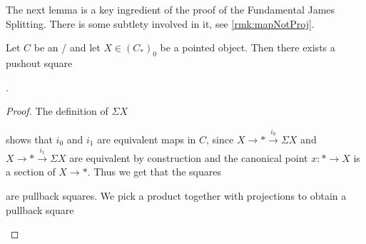 The next lemma is a key ingredient of the proof of the Fundamental James Splitting.
There is some subtlety involved in it, see \cref{rmk:mapNotProj}.
\begin{lemma}\label{lem:existenceOfPoSq}
    Let $C$ be an \inftytop/ and let $X\in \left(C_*\right)_0$ be a pointed object.
    Then there exists a pushout square  
    \begin{center}
        \;.
    \end{center}
    \begin{proof}
        The definition of $\Sigma X$
        \begin{center}
        \end{center}
        shows that $i_0$ and $i_1$ are equivalent maps in $C$, since $X\to *\xrightarrow{i_0}\Sigma X$ and $X\to *\xrightarrow{i_1}\Sigma X$ are equivalent by construction and the canonical point $x\colon*\to X$ is a section of $X\to *$.
        Thus we get that the squares
        \begin{center}
        \end{center}
        are pullback squares.
        We pick a product together with projections to obtain a pullback square 
        \begin{center}

\end{center}
\end{proof}
\end{lemma}
